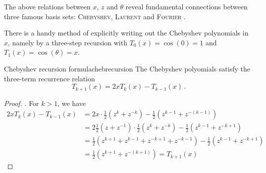 \documentclass[12pt, a4paper]{article}
\newcommand{\chebyshev}{Chebyshev\xspace}
\begin{document}
  The above relations between $x$, $z$ and $\theta$ reveal fundamental connections between three famous basis sets: \textsc{\chebyshev}, \textsc{Laurent} and \textsc{Fourier} \parencite{atap}.

  There is a handy method of explicitly writing out the \chebyshev polynomials in $x$, namely by a three-step recursion with $T_0(x) = \cos(0) = 1$ and $T_1(x) = \cos(\theta) = x$.

  \begin{theorem}{Chebyshev recursion formula}{chebrecursion}
    The \chebyshev polyomials satisfy the three-term recurrence relation $$T_{k+1}(x) = 2x T_k(x) - T_{k-1}(x) \,.$$
  \end{theorem}
  \begin{proof}{\parencite{atap}.}
    For $k > 1$, we have
    \begin{align*}
      2x T_k(x) - T_{k-1}(x) & = 2x \cdot \frac{1}{2} (z^k + z^{-k}) - \frac{1}{2} (z^{k-1} + z^{-(k-1)})                     \\
                             & = 2 \frac{1}{2}(z + z^{-1}) \cdot \frac{1}{2}(z^k + z^{-k}) - \frac{1}{2} (z^{k-1} + z^{-k+1}) \\
                             & = \frac{1}{2} (z^{k+1} + z^{k-1} + z^{-k+1} + z^{-k-1}) - \frac{1}{2} (z^{k-1} + z^{-k+1})     \\
                             & = \frac{1}{2} (z^{k+1} + z^{-(k+1)}) = T_{k+1}(x)
    \end{align*}
  \end{proof}
\end{document}
